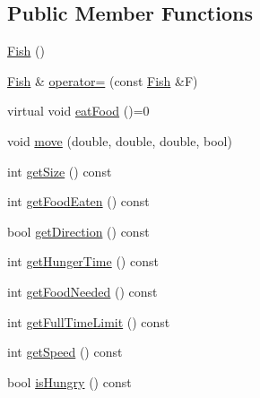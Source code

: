 \subsection*{Public Member Functions}
\begin{DoxyCompactItemize}
\item 
\mbox{\hyperlink{class_fish_a265fa9dc23037b5f621ff5f2b2731e9b}{Fish}} ()
\item 
\mbox{\hyperlink{class_fish}{Fish}} \& \mbox{\hyperlink{class_fish_a45789c6c8ecafbcfae866845f34a7f33}{operator=}} (const \mbox{\hyperlink{class_fish}{Fish}} \&F)
\item 
virtual void \mbox{\hyperlink{class_fish_aad629fb35c786b2a44c1204d011f9ae4}{eat\+Food}} ()=0
\item 
void \mbox{\hyperlink{class_fish_ae746baf504f478e83b7b314b7e80eb48}{move}} (double, double, double, bool)
\item 
int \mbox{\hyperlink{class_fish_a00b7df960ce799914b15b0e95ecfa4c8}{get\+Size}} () const
\item 
int \mbox{\hyperlink{class_fish_a43f71b5e1940fec9aee01ba7ecb7cc5b}{get\+Food\+Eaten}} () const
\item 
bool \mbox{\hyperlink{class_fish_a411294175d2104ba12bf205b529f59bd}{get\+Direction}} () const
\item 
int \mbox{\hyperlink{class_fish_aca713642313f9c438e900235c0c727d6}{get\+Hunger\+Time}} () const
\item 
int \mbox{\hyperlink{class_fish_a5ebfe16e94d3e605d703efbd47aa2a07}{get\+Food\+Needed}} () const
\item 
int \mbox{\hyperlink{class_fish_a40a7508eeee947749bc76e67eeca01cc}{get\+Full\+Time\+Limit}} () const
\item 
int \mbox{\hyperlink{class_fish_af495566d33b8e3b83605a8222bc02783}{get\+Speed}} () const
\item 
bool \mbox{\hyperlink{class_fish_a0b45770c92baa9471ae6dc2ebf15d159}{is\+Hungry}} () const
\end{DoxyCompactItemize}
